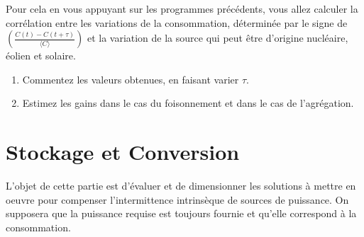 \documentclass[12pt,a4,french]{article}
\newcommand{\tmtextit}[1]{{\itshape{#1}}}
\begin{document}
Pour cela en vous appuyant sur les programmes précédents, vous allez calculer la corrélation entre les variations de la consommation, déterminée par le signe de $\left( \frac{C (t) - C (t + \tau)}{\langle C \rangle} \right)$ et la variation de la source qui peut être d'origine nucléaire, éolien et solaire.

\begin{enumerate}
	\item Commentez les valeurs obtenues, en faisant varier $\tau$.
	
	\item Estimez les gains dans le cas du foisonnement et dans le cas de l'agrégation.
	
\end{enumerate}

%
%
%	
%	



\part{Stockage et Conversion}
L'objet de cette partie est d'évaluer et de dimensionner les solutions à mettre en oeuvre pour compenser l'intermittence intrinsèque de sources de puissance. On supposera que la puissance requise est toujours fournie et qu'elle correspond à la consommation.


%	
%	
%	
%	
%	
\end{document}
